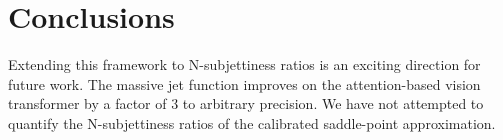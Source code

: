 \section{Conclusions}\label{sec:conclusions}

Extending this framework to N-subjettiness ratios is an exciting
direction for future work. The massive jet function improves on the
attention-based vision transformer by a factor of 3 to arbitrary
precision. We have not attempted to quantify the N-subjettiness ratios
of the calibrated saddle-point approximation.

